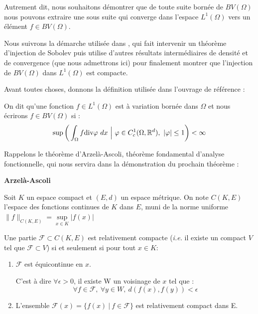 Autrement dit, nous souhaitons démontrer que de toute suite bornée de $BV(\Omega)$ nous pouvons extraire une sous suite qui converge dans l'espace $L^1(\Omega)$ vers un élément $f \in BV(\Omega)$.

Nous suivrons la démarche utilisée dans \cite{Evans}, qui fait intervenir un théorème d'injection de Sobolev puis utilise d'autres résultats intermédiaires de densité et de convergence (que nous admettrons ici) pour finalement montrer que l'injection de $BV(\Omega)$ dans $L^1(\Omega)$ est compacte.

Avant toutes choses, donnons la définition utilisée dans l'ouvrage de référence : 
\begin{definitionbox}
\begin{definition}
    
    On dit qu'une fonction $f \in L^1(\Omega)$ est à variation bornée dans $\Omega$ et nous écrirons $f \in BV(\Omega)$ si :
    $$\sup\bigg( \int_{\Omega} f\text{div}\varphi \ dx \ \Big| \ \varphi \in C^1_c(\Omega,\R^d), \ |\varphi| \leq 1 \bigg) < \infty$$
\end{definition}
\end{definitionbox}

Rappelons le théorème d'Arzelà-Ascoli, théorème fondamental d'analyse fonctionnelle, qui nous servira dans la démonstration du prochain théorème :

\begin{theorembox}
\begin{theorem}
    \textbf{Arzelà-Ascoli}

    Soit $K$ un espace compact et $(E,d)$ un espace métrique. On note $C(K,E)$ l'espace des fonctions continues de $K$ dans $E$, muni de la norme uniforme $\|f\|_{C(K,E)} = \underset{x \in K}{\sup} |f(x)|$

    Une partie $\mathcal{F} \subset C(K,E)$ est relativement compacte (\textit{i.e.} il existe un compact $V$ tel que $\mathcal{F} \subset V$) si et seulement si pour tout $x \in K$:
    \begin{enumerate}
        \item $\mathcal{F}$ est équicontinue en $x$. 
        
        C'est à dire $\forall \epsilon >0$, il existe W un voisinage de $x$ tel que :
        $$\forall f \in \mathcal{F}, \ \forall y \in W, \ d(f(x),f(y)) < \epsilon$$
        
        \item L'ensemble $\mathcal{F}(x) = \big\{ f(x) \ | \ f \in \mathcal{F} \big\}$ est relativement compact dans E.
    \end{enumerate}
\end{theorem}
\end{theorembox}

